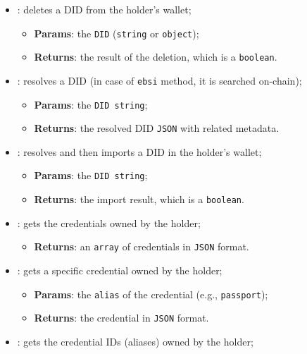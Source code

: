 \begin{itemize}
\begin{itemize}
\begin{itemize}
        \end{itemize}
        \item[] : deletes a DID from the holder's wallet;
        \begin{itemize}
            \item \textbf{Params}: the \texttt{DID} (\texttt{string} or \texttt{object});
            \item \textbf{Returns}: the result of the deletion, which is a \texttt{boolean}.
        \end{itemize}
        \item[] : resolves a DID (in case of \texttt{ebsi} method, it is
        searched on-chain);
        \begin{itemize}
            \item \textbf{Params}: the \texttt{DID string};
            \item \textbf{Returns}: the resolved DID \texttt{JSON} with related metadata.
        \end{itemize}
        \item[] : resolves and then imports a DID in the holder's wallet;
        \begin{itemize}
            \item \textbf{Params}: the \texttt{DID string};
            \item \textbf{Returns}: the import result, which is a \texttt{boolean}.
        \end{itemize}
        \item[] : gets the credentials owned by the holder;
        \begin{itemize}
            \item \textbf{Returns}: an \texttt{array} of credentials in \texttt{JSON} format.
        \end{itemize}
        \item[] : gets a specific credential owned by the holder;
        \begin{itemize}
            \item \textbf{Params}: the \texttt{alias} of the credential (e.g., \texttt{passport});
            \item \textbf{Returns}: the credential in \texttt{JSON} format.
        \end{itemize}
        \item[] : gets the credential IDs (aliases) owned by the holder;
        \begin{itemize}

\end{itemize}
\end{itemize}
\end{itemize}
